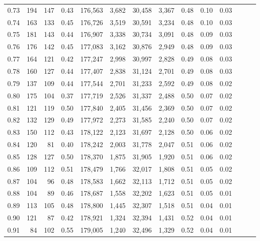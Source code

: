 \begin{tabular}{rrrrrrrrrrrrrr}
0.73 &    194 &  147 &  0.43 &  176,563 &    3,682 &  30,458 &   3,367 &  0.48 &  0.10 &      0.03 \\
0.74 &    163 &  133 &  0.45 &  176,726 &    3,519 &  30,591 &   3,234 &  0.48 &  0.10 &      0.03 \\
0.75 &    181 &  143 &  0.44 &  176,907 &    3,338 &  30,734 &   3,091 &  0.48 &  0.09 &      0.03 \\
0.76 &    176 &  142 &  0.45 &  177,083 &    3,162 &  30,876 &   2,949 &  0.48 &  0.09 &      0.03 \\
0.77 &    164 &  121 &  0.42 &  177,247 &    2,998 &  30,997 &   2,828 &  0.49 &  0.08 &      0.03 \\
0.78 &    160 &  127 &  0.44 &  177,407 &    2,838 &  31,124 &   2,701 &  0.49 &  0.08 &      0.03 \\
0.79 &    137 &  109 &  0.44 &  177,544 &    2,701 &  31,233 &   2,592 &  0.49 &  0.08 &      0.02 \\
0.80 &    175 &  104 &  0.37 &  177,719 &    2,526 &  31,337 &   2,488 &  0.50 &  0.07 &      0.02 \\
0.81 &    121 &  119 &  0.50 &  177,840 &    2,405 &  31,456 &   2,369 &  0.50 &  0.07 &      0.02 \\
0.82 &    132 &  129 &  0.49 &  177,972 &    2,273 &  31,585 &   2,240 &  0.50 &  0.07 &      0.02 \\
0.83 &    150 &  112 &  0.43 &  178,122 &    2,123 &  31,697 &   2,128 &  0.50 &  0.06 &      0.02 \\
0.84 &    120 &   81 &  0.40 &  178,242 &    2,003 &  31,778 &   2,047 &  0.51 &  0.06 &      0.02 \\
0.85 &    128 &  127 &  0.50 &  178,370 &    1,875 &  31,905 &   1,920 &  0.51 &  0.06 &      0.02 \\
0.86 &    109 &  112 &  0.51 &  178,479 &    1,766 &  32,017 &   1,808 &  0.51 &  0.05 &      0.02 \\
0.87 &    104 &   96 &  0.48 &  178,583 &    1,662 &  32,113 &   1,712 &  0.51 &  0.05 &      0.02 \\
0.88 &    104 &   89 &  0.46 &  178,687 &    1,558 &  32,202 &   1,623 &  0.51 &  0.05 &      0.01 \\
0.89 &    113 &  105 &  0.48 &  178,800 &    1,445 &  32,307 &   1,518 &  0.51 &  0.04 &      0.01 \\
0.90 &    121 &   87 &  0.42 &  178,921 &    1,324 &  32,394 &   1,431 &  0.52 &  0.04 &      0.01 \\
0.91 &     84 &  102 &  0.55 &  179,005 &    1,240 &  32,496 &   1,329 &  0.52 &  0.04 &      0.01 \\

\end{tabular}
